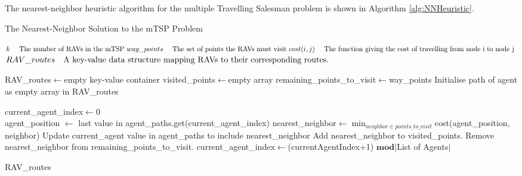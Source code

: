 The nearest-neighbor heuristic algorithm for the multiple Travelling Salesman problem is shown in Algorithm \ref{alg:NNHeuristic}.
\begin{algorithm}
\caption{The Nearest-Neighbor Solution to the mTSP Problem}
\label{alg:NNHeuristic}
\begin{algorithmic}[1]
\renewcommand{\algorithmicrequire}{\textbf{Input:}}
\renewcommand{\algorithmicensure}{\textbf{Output:}}

\REQUIRE$ \newline k \quad \text{ The number of RAVs in the mTSP }
\newline way\_points \quad \text{ The set of points the RAVs must visit }
\newline cost(i,j) \quad \text{ The function giving the cost of travelling from node i to node j }
$
\ENSURE $ \newline RAV\_routes \quad \text{A key-value data structure mapping RAVs to their corresponding routes.}
$

\hfill\pagebreak

\STATE RAV\_routes$\leftarrow$empty key-value container
\STATE visited\_points$\leftarrow$empty array
\STATE remaining\_points\_to\_visit$\leftarrow$way\_points
\STATE Initialise path of agent as empty array in RAV\_routes
\ENDFOR

current\_agent\_index$\leftarrow$0\\
\hfill\pagebreak
{}
\STATE agent\_position $\leftarrow$ last value in agent\_paths.get(current\_agent\_index)
\STATE nearest\_neighbor$\leftarrow$\(\displaystyle \min_{neighbor \in points\_to\_visit}\)cost(agent\_position, neighbor)
\STATE Update current\_agent value in agent\_paths to include nearest\_neighbor
\STATE Add nearest\_neighbor to visited\_points.
\STATE Remove nearest\_neighbor from remaining\_points\_to\_visit.
\STATE current\_agent\_index$\leftarrow$(currentAgentIndex+1) $\mathbf{mod}$$\vert$List of Agents$\vert$



\ENDWHILE
\RETURN RAV\_routes
\end{algorithmic} 
\end{algorithm}
